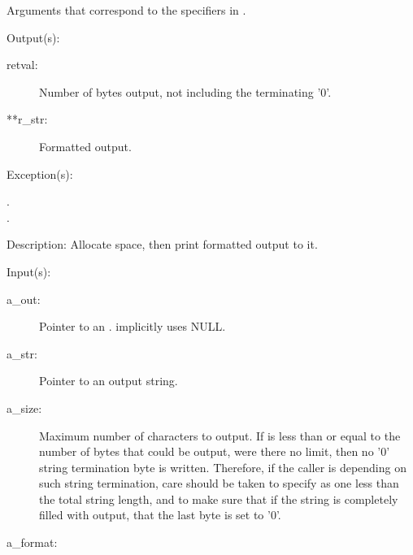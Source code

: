 \begin{capi}
\begin{capilist}
\begin{description}
			Arguments that correspond to the specifiers in
			.
		\end{description}
	\item[Output(s): ]
		\begin{description}\item[]
		\item[retval: ]
			Number of bytes output, not including the terminating
			'{\bs}0'.
		\item[**r\_str: ]
			Formatted output.
		\end{description}
	\item[Exception(s): ]
		\begin{description}\item[]
		\item[.]
		\item[.]
		\end{description}
	\item[Description: ]
		Allocate space, then print formatted output to it.
	\end{capilist}
\label{out_put_sn}
\label{_cw_out_put_sn}
	\begin{capilist}
	\item[Input(s): ]
		\begin{description}\item[]
		\item[a\_out: ]
			Pointer to an .
			 implicitly uses NULL.
		\item[a\_str: ]
			Pointer to an output string.
		\item[a\_size: ]
			Maximum number of characters to output.  If
			 is less than or equal to the number of
			bytes that could be output, were there no limit, then no
			'{\bs}0' string termination byte is written.  Therefore,
			if the caller is depending on such string termination,
			care should be taken to specify  as one
			less than the total string length, and to make sure that
			if the string is completely filled with output, that the
			last byte is set to '{\bs}0'.
		\item[a\_format: ]

\end{description}
\end{capilist}
\end{capi}
